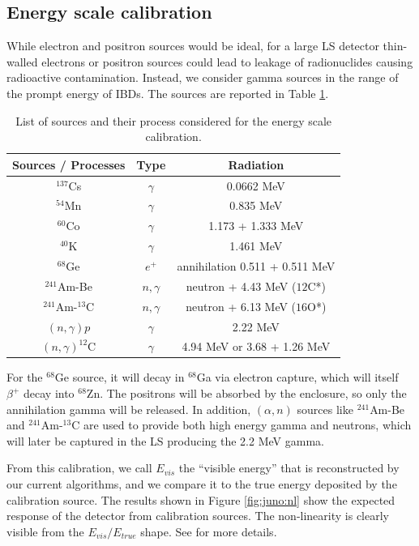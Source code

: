 \documentclass[../main.tex]{subfiles}
\begin{document}
\subsection{Energy scale calibration}

While electron and positron sources would be ideal, for a large LS detector thin-walled electrons or positron sources could lead to leakage of radionuclides causing radioactive contamination. Instead, we consider gamma sources in the range of the prompt energy of IBDs. The sources are reported in Table \ref{tab:juno:calib_source}.

\begin{table}[ht]
  \centering
  \begin{tabular}{|c|c|c|}
    \hline
    Sources / Processes & Type & Radiation \\
    \hline
    $^{137}$Cs          & $\gamma$ & 0.0662 MeV \\
    $^{54}$Mn           & $\gamma$ & 0.835 MeV \\
    $^{60}$Co           & $\gamma$ & 1.173 + 1.333 MeV \\
    $^{40}$K            & $\gamma$ & 1.461 MeV \\
    $^{68}$Ge           & $e^{+}$  &  annihilation 0.511 + 0.511 MeV \\
    $^{241}$Am-Be       & $n,\gamma$ & neutron + 4.43 MeV (${12}$C*) \\
    $^{241}$Am-$^{13}$C & $n,\gamma$ & neutron + 6.13 MeV (${16}$O*) \\
    $(n, \gamma)p$      & $\gamma$ & 2.22 MeV \\
    $(n, \gamma)^{12}$C & $\gamma$ & 4.94 MeV or 3.68 + 1.26 MeV \\
    \hline
  \end{tabular}
  \caption{List of sources and their process considered for the energy scale calibration.}
  \label{tab:juno:calib_source}
\end{table}

For the $^{68}$Ge source, it will decay in $^{68}$Ga via electron capture, which will itself $\beta^+$ decay into $^{68}$Zn. The positrons will be absorbed by the enclosure, so only the annihilation gamma will be released. In addition, $(\alpha, n)$ sources like $^{241}$Am-Be and $^{241}$Am-$^{13}$C are used to provide both high energy gamma and neutrons, which will later be captured in the LS producing the 2.2 MeV gamma.

From this calibration, we call $E_{vis}$ the ``visible energy'' that is reconstructed by our current algorithms, and we compare it to the true energy deposited by the calibration source. The results shown in Figure \ref{fig:juno:nl} show the expected response of the detector from calibration sources. The non-linearity is clearly visible from the $E_{vis} / E_{true}$ shape. See \cite{juno_collaboration_calibration_2021} for more details.
\end{document}
